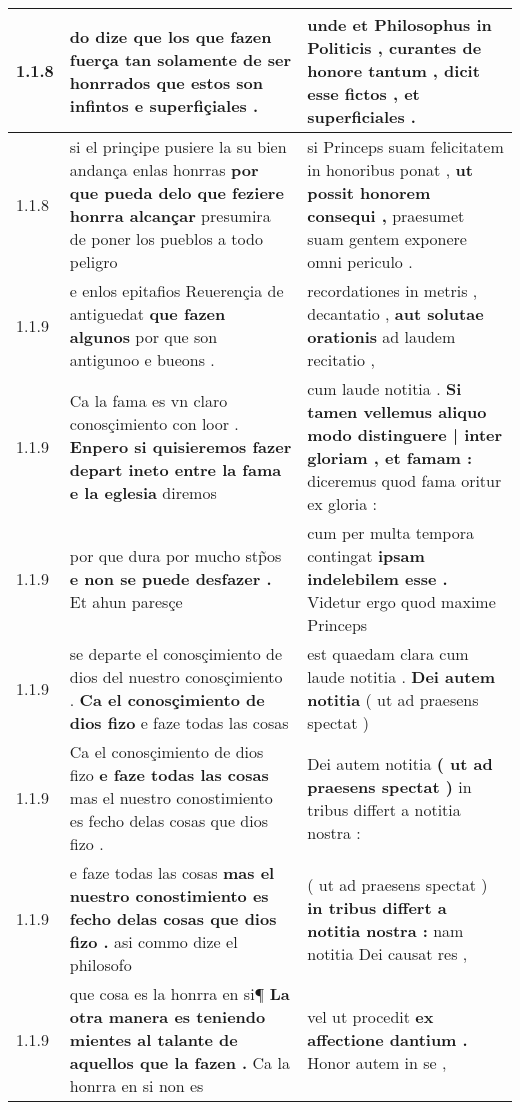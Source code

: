 \begin{tabular}{|p{1cm}|p{6.5cm}|p{6.5cm}|}
1.1.8 & do dize \textbf{ que los que fazen fuerça tan solamente de ser honrrados } que estos son infintos e superfiçiales . & unde et Philosophus in Politicis , \textbf{ curantes de honore tantum , } dicit esse fictos , et superficiales . \\\hline
1.1.8 & si el prinçipe pusiere la su bien andança enlas honrras \textbf{ por que pueda delo que feziere honrra alcançar } presumira de poner los pueblos a todo peligro & si Princeps suam felicitatem in honoribus ponat , \textbf{ ut possit honorem consequi , } praesumet suam gentem exponere omni periculo . \\\hline
1.1.9 & e enlos epitafios Reuerençia de antiguedat \textbf{ que fazen algunos } por que son antigunoo e bueons . & recordationes in metris , decantatio , \textbf{ aut solutae orationis } ad laudem recitatio , \\\hline
1.1.9 & Ca la fama es vn claro conosçimiento con loor . \textbf{ Enpero si quisieremos fazer depart ineto entre la fama e la eglesia } diremos & cum laude notitia . \textbf{ Si tamen vellemus aliquo modo distinguere | inter gloriam , et famam : } diceremus quod fama oritur ex gloria : \\\hline
1.1.9 & por que dura por mucho stp̃os \textbf{ e non se puede desfazer . } Et ahun paresçe & cum per multa tempora contingat \textbf{ ipsam indelebilem esse . } Videtur ergo quod maxime Princeps \\\hline
1.1.9 & se departe el conosçimiento de dios del nuestro conosçimiento . \textbf{ Ca el conosçimiento de dios fizo } e faze todas las cosas & est quaedam clara cum laude notitia . \textbf{ Dei autem notitia } ( ut ad praesens spectat ) \\\hline
1.1.9 & Ca el conosçimiento de dios fizo \textbf{ e faze todas las cosas } mas el nuestro conostimiento es fecho delas cosas que dios fizo . & Dei autem notitia \textbf{ ( ut ad praesens spectat ) } in tribus differt a notitia nostra : \\\hline
1.1.9 & e faze todas las cosas \textbf{ mas el nuestro conostimiento es fecho delas cosas que dios fizo . } asi commo dize el philosofo & ( ut ad praesens spectat ) \textbf{ in tribus differt a notitia nostra : } nam notitia Dei causat res , \\\hline
1.1.9 & que cosa es la honrra en si¶ \textbf{ La otra manera es teniendo mientes al talante de aquellos que la fazen . } Ca la honrra en si non es & vel ut procedit \textbf{ ex affectione dantium . } Honor autem in se , \\\hline

\end{tabular}
